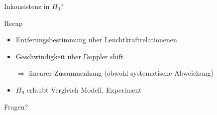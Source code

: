 \documentclass[10pt, dvipsnames]{beamer}
\begin{document}
	\begin{frame}{Inkonsistenz in \( H_0 \)?}
		\centering	
	\end{frame}

	\begin{frame}{Recap}
		\begin{itemize}[label={\textendash}, itemindent=0.1cm]
			\item {\color{MyBlue}Entferungsbestimmung} über Leuchtkraftrelationenen
			\item {\color{MyOrange}Geschwindigkeit} über Doppler shift
			\item[\( \Rightarrow \)] linearer Zusammenhang (obwohl systematische Abweichung)
			\item \( H_0 \) erlaubt Vergleich Modell, Experiment
		\end{itemize}
	\end{frame}

\begin{frame}[standout]
	\Huge Fragen?
\end{frame}
\end{document}

